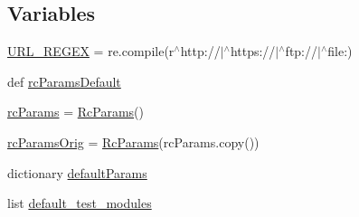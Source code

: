 \subsection*{Variables}
\begin{DoxyCompactItemize}
\item 
\hyperlink{namespacematplotlib_ae573a9e7b46ba9090ad27696d75d0f5b}{U\+R\+L\+\_\+\+R\+E\+G\+EX} = re.\+compile(r\textquotesingle{}$^\wedge$http\+://$\vert$$^\wedge$https\+://$\vert$$^\wedge$ftp\+://$\vert$$^\wedge$file\+:\textquotesingle{})
\item 
def \hyperlink{namespacematplotlib_a306b794e30fdab5ad5cb2adcc6e3ec43}{rc\+Params\+Default}
\item 
\hyperlink{namespacematplotlib_a685c63e0405a4ac508c17ce26dd0f92e}{rc\+Params} = \hyperlink{classmatplotlib_1_1RcParams}{Rc\+Params}()
\item 
\hyperlink{namespacematplotlib_aea67c86e719473e3b271b493e7e39ef9}{rc\+Params\+Orig} = \hyperlink{classmatplotlib_1_1RcParams}{Rc\+Params}(rc\+Params.\+copy())
\item 
dictionary \hyperlink{namespacematplotlib_ae61a514c4b7b0c30f9d36eea8cece8a6}{default\+Params}
\item 
list \hyperlink{namespacematplotlib_a86a0208b6f53ed86ebee511aa69d45bb}{default\+\_\+test\+\_\+modules}
\end{DoxyCompactItemize}


